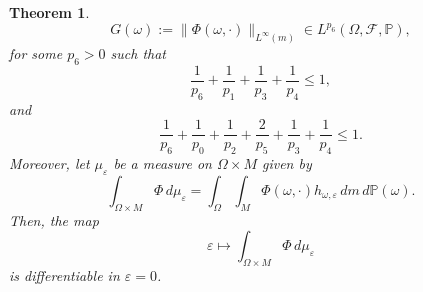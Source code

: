 \documentclass[11pt,reqno,a4paper]{article}
\newtheorem{maintheorem}{Theorem}
\theoremstyle{special}
\renewcommand{\epsilon}{\varepsilon}
\begin{document}
\begin{maintheorem}
\[
G(\omega):=\| \Phi(\omega, \cdot)\|_{L^\infty(m)}\in L^{p_6}(\Omega, \mathcal F, \mathbb P),
\]
for some $p_6>0$ such that 
\begin{equation}\label{coeff}
   \frac{1}{p_6}+ \frac{1}{p_1}+\frac{1}{p_3}+\frac{1}{p_4}\le 1, 
\end{equation}
and
\begin{equation}\label{coeff2}
\frac{1}{p_6}+\frac{1}{p_0}+\frac{1}{p_2}+\frac{2}{p_5}+\frac{1}{p_3}+\frac{1}{p_4}\le 1.
\end{equation}
Moreover, let $\mu_\epsilon$ be a measure on $\Omega \times M$ given by 
\[
\int_{\Omega \times M}\Phi \, d\mu_\epsilon=\int_{\Omega}\int_M \Phi(\omega, \cdot)h_{\omega, \epsilon}\, dm\, d\mathbb P(\omega).
\] 
Then, the map
\[
\epsilon \mapsto \int_{\Omega \times M}\Phi \, d\mu_\epsilon
\]
is differentiable in $\epsilon=0$.
\end{maintheorem}
\end{document}
